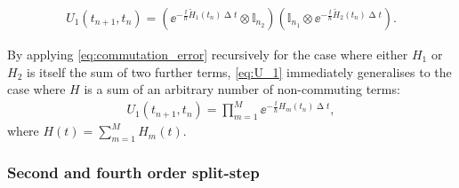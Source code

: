 \begin{align}\label{eq:U_1_subspace}
U_1(t_{n+1}, t_n) =
\left(\ee^{-\frac \ii \hbar \tilde H_1(t_n)\upDelta t}\otimes \mathbb{I}_{n_2}\right)
\left(\mathbb{I}_{n_1}\otimes\ee^{-\frac \ii \hbar \tilde H_2(t_n)\upDelta t}\right).
\end{align}

By applying \eqref{eq:commutation_error} recursively for the case where either $H_1$ or $H_2$ is itself the sum of two further terms, \eqref{eq:U_1} immediately generalises to the case where $H$ is a sum of an arbitrary number of non-commuting terms:
\begin{align}\label{eq:U_1_arbitrary_terms}
U_1(t_{n+1}, t_n) = \prod_{m=1}^M \ee^{-\frac \ii \hbar H_m(t_n)\upDelta t},
\end{align}
where $H(t) = \sum_{m=1}^M H_m(t)$.

\subsubsection{Second and fourth order split-step}

